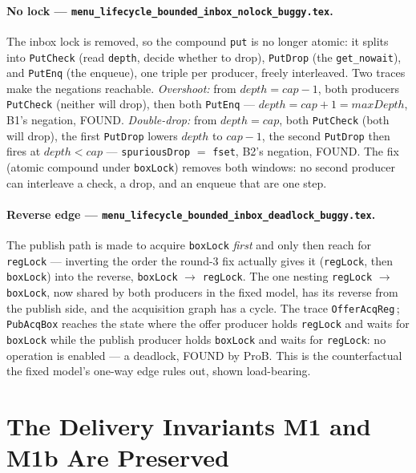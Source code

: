 \documentclass[a4paper,10pt,fleqn]{article}
\begin{document}
\paragraph{No lock --- \texttt{menu\_lifecycle\_bounded\_inbox\_nolock\_buggy.tex}.}
\label{sec:fidelity-nolock}
The inbox lock is removed, so the compound \texttt{put} is no longer atomic: it
splits into \texttt{PutCheck} (read \texttt{depth}, decide whether to drop),
\texttt{PutDrop} (the \texttt{get\_nowait}), and \texttt{PutEnq} (the enqueue),
one triple per producer, freely interleaved. Two traces make the negations
reachable. \emph{Overshoot:} from $depth = cap - 1$, both producers
\texttt{PutCheck} (neither will drop), then both \texttt{PutEnq} ---
$depth = cap + 1 = maxDepth$, B1's negation, FOUND. \emph{Double-drop:} from
$depth = cap$, both \texttt{PutCheck} (both will drop), the first \texttt{PutDrop}
lowers $depth$ to $cap - 1$, the second \texttt{PutDrop} then fires at
$depth < cap$ --- \texttt{spuriousDrop} $=$ \texttt{fset}, B2's negation, FOUND.
The fix (atomic compound under \texttt{boxLock}) removes both windows: no second
producer can interleave a check, a drop, and an enqueue that are one step.

\paragraph{Reverse edge --- \texttt{menu\_lifecycle\_bounded\_inbox\_deadlock\_buggy.tex}.}
\label{sec:fidelity-deadlock}
The publish path is made to acquire \texttt{boxLock} \emph{first} and only then
reach for \texttt{regLock} --- inverting the order the round-3 fix actually
gives it (\texttt{regLock}, then \texttt{boxLock}) into the reverse,
\texttt{boxLock} $\to$ \texttt{regLock}. The one nesting \texttt{regLock} $\to$
\texttt{boxLock}, now shared by both producers in the fixed model, has its
reverse from the publish side, and the acquisition graph has a cycle. The trace
\texttt{OfferAcqReg}\,;\,\texttt{PubAcqBox} reaches the state where the offer
producer holds \texttt{regLock} and waits for \texttt{boxLock} while the publish
producer holds \texttt{boxLock} and waits for \texttt{regLock}: no operation is
enabled --- a deadlock, FOUND by ProB. This is the counterfactual the fixed
model's one-way edge rules out, shown load-bearing.

\section{The Delivery Invariants M1 and M1b Are Preserved}
\label{sec:m1}
\end{document}
